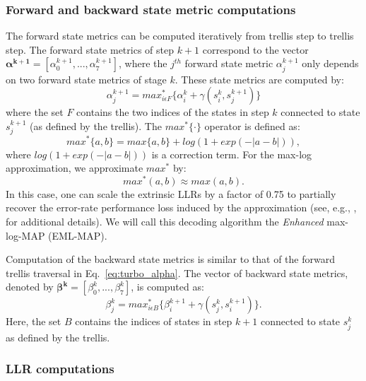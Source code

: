 \subsubsection{Forward and backward state metric computations}

The forward state metrics can be computed iteratively from trellis step to
trellis step. The forward state metrics of step $k+1$ correspond to the vector
$\mathbf{\alpha^{k+1}} = [\alpha_0^{k+1}, ... ,\alpha_7^{k+1}]$, where the
$j^{th}$ forward state metric $\alpha_j^{k+1}$ only depends on two forward
state metrics of stage $k$. These state metrics are computed by:
\begin{equation}
  \label{eq:turbo_alpha}
  \alpha_j^{k+1} =
  max^*_{i \epsilon F} \{ \alpha_i^k + \gamma(s_i^k, s_j^{k+1}) \}
\end{equation}
where the set $F$ contains the two indices of the states in step $k$ connected
to state $s_j^{k+1}$ (as defined by the trellis). The $max^*\{·\}$ operator is
defined as:
\begin{equation}
   max^*\{a,b\} = max\{a,b\} + log(1 + exp(-|a-b|)),
\end{equation}
where $log(1 + exp(-|a-b|))$ is a correction term. For the max-log
approximation, we approximate $max^*$ by:
\begin{equation*}
   max^*(a, b) \approx max(a, b).
\end{equation*}
In this case, one can scale the extrinsic LLRs by a factor of 0.75 to partially
recover the error-rate performance loss induced by the approximation (see, e.g.,
\cite{Vogt2000}, \cite{Studer2011} for additional details). We will call this
decoding algorithm the \emph{Enhanced} max-log-MAP (EML-MAP).

Computation of the backward state metrics is similar to that of the forward
trellis traversal in Eq.~\ref{eq:turbo_alpha}. The vector of backward state
metrics, denoted by $\mathbf{\beta^k} = [\beta_0^k, ..., \beta_7^k]$, is
computed as:
\begin{equation}
  \label{eq:turbo_beta}
  \beta_j^k =
  max^*_{i \epsilon B} \{ \beta_i^{k+1} + \gamma(s_j^k, s_i^{k+1}) \}.
\end{equation}
Here, the set $B$ contains the indices of states in step $k+1$ connected to
state $s_j^k$ as defined by the trellis.

\subsubsection{LLR computations}


